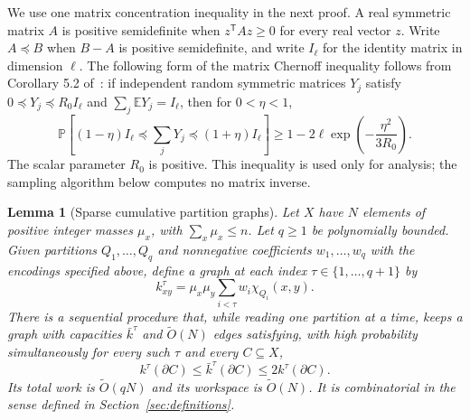 \documentclass[11pt]{article}
\newtheorem{lemma}[theorem]{Lemma}
\theoremstyle{definition}
\newcommand{\E}{\mathbb E}
\newcommand{\Prb}{\mathbb P}
\newcommand{\wt}{\widetilde}
\newcommand{\join}{\chi}
\newcommand{\cut}{\partial}
\begin{document}
We use one matrix concentration inequality in the next proof. A real
symmetric matrix $A$ is positive semidefinite when $z^{\mathsf T}Az\ge0$
for every real vector $z$. Write $A\preceq B$ when $B-A$ is positive
semidefinite, and write $I_\ell$ for the identity matrix in dimension
$\ell$. The following form of the matrix Chernoff inequality follows
from Corollary 5.2 of~\cite{Tropp12}: if independent random symmetric
matrices $Y_j$ satisfy $0\preceq Y_j\preceq R_0I_\ell$ and
$\sum_j\E Y_j=I_\ell$, then for $0<\eta<1$,
\[
 \Prb\!\left[(1-\eta)I_\ell\preceq\sum_jY_j
                    \preceq(1+\eta)I_\ell\right]
 \ge1-2\ell\exp\!\left(-\frac{\eta^2}{3R_0}\right).
\]
The scalar parameter $R_0$ is positive. This inequality is used only
for analysis; the sampling algorithm below computes no matrix inverse.

\begin{lemma}[Sparse cumulative partition graphs]\label{lem:prefix-core}
Let $X$ have $N$ elements of positive integer masses $\mu_x$, with
$\sum_x\mu_x\le n$. Let $q\ge1$ be polynomially bounded. Given
partitions $Q_1,\ldots,Q_q$ and nonnegative coefficients $w_1,\ldots,w_q$
with the encodings specified above, define a graph at each index
$\tau\in\{1,\ldots,q+1\}$ by
\[
 k^\tau_{xy}=\mu_x\mu_y\sum_{i<\tau}w_i\join_{Q_i}(x,y).
\]
There is a sequential procedure that, while reading one partition at a time,
keeps a graph with capacities $\bar k^\tau$ and $\wt O(N)$ edges
satisfying, with high probability simultaneously for every such $\tau$
and every $C\subseteq X$,
\[
 k^\tau(\cut C)\le\bar k^\tau(\cut C)\le2k^\tau(\cut C).
\]
Its total work is $\wt O(qN)$ and its workspace is $\wt O(N)$.
It is combinatorial in the sense defined in Section~\ref{sec:definitions}.
\end{lemma}
\end{document}
